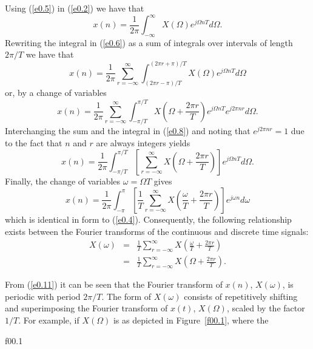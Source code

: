 	Using (\ref{e0.5}) in (\ref{e0.2}) we have that
%
\begin{equation}
x(n)=\frac{1}{2\pi}\int_{-\infty}^{\infty}X(\Omega)e^{j\Omega nT}d\Omega.
\label{e0.6}
\end{equation}
%
Rewriting the integral in (\ref{e0.6}) as a sum of integrals
over intervals of length $2\pi/T$ we have that
%
\begin{equation}
x(n)=\frac{1}{2\pi}\sum_{r=-\infty}^{\infty}
     \int_{(2\pi r -\pi)/T}^{(2\pi r +\pi)/T}
         X(\Omega)e^{j\Omega nT}d\Omega
\label{e0.7}
\end{equation}
%
or, by a change of variables
%
\begin{equation}
x(n)=\frac{1}{2\pi}\sum_{r=-\infty}^{\infty}
     \int_{-\pi/T}^{\pi/T}
         X(\Omega+\frac{2\pi r}{T})e^{j\Omega nT}e^{j2\pi nr}d\Omega.
\label{e0.8}
\end{equation}
%
Interchanging the sum and the integral in (\ref{e0.8}) and 
noting that $e^{j2\pi nr}=1$ due to the fact that $n$ and $r$
are always integers yields
%
\begin{equation}
x(n)=\frac{1}{2\pi}\int_{-\pi/T}^{\pi/T}
      [\sum_{r=-\infty}^{\infty}
         X(\Omega+\frac{2\pi r}{T})]e^{j\Omega nT}d\Omega.
\label{e0.9}
\end{equation}
%
Finally, the change of variables $\omega=\Omega T$ gives
%
\begin{equation}
x(n)=\frac{1}{2\pi}\int_{-\pi}^{\pi}
      [\frac{1}{T}\sum_{r=-\infty}^{\infty}
         X(\frac{\omega}{T}+\frac{2\pi r}{T})]e^{j\omega n}d\omega
\label{e0.10}
\end{equation}
%
which is identical in form to (\ref{e0.4}).  Consequently,
the following relationship exists between the
Fourier transforms of the continuous and discrete
time signals:
%
\begin{eqnarray}
X(\omega)&=&\frac{1}{T}\sum_{r=-\infty}^{\infty}
         X(\frac{\omega}{T}+\frac{2\pi r}{T})\nonumber\\
         &=&\frac{1}{T}\sum_{r=-\infty}^{\infty}
         X(\Omega+\frac{2\pi r}{T}).
\label{e0.11}
\end{eqnarray}
%

	From (\ref{e0.11}) it can be seen that
the Fourier transform of $x(n)$, $X(\omega)$, is 
periodic with period $2\pi/T$.  The form of $X(\omega)$ consists of
repetitively shifting and superimposing the Fourier transform of 
$x(t)$, $X(\Omega)$, scaled by the factor $1/T$.  For example,
if $X(\Omega)$ is as depicted in Figure~\ref{f00.1}, where the 
%

{f00.1}

